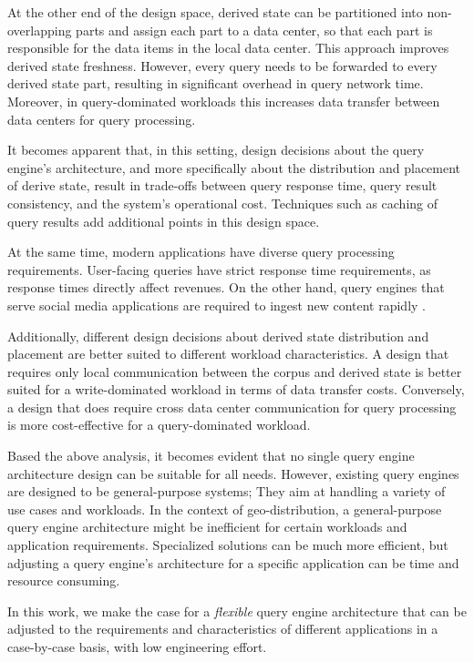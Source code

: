 At the other end of the design space,
derived state can be partitioned into non-overlapping parts and assign each part to a data center,
so that each part is responsible for the data items in the local data center.
This approach improves derived state freshness.
However, every query needs to be forwarded to every derived state part, resulting in significant overhead in query network time.
Moreover, in query-dominated workloads this increases data transfer between data centers for query processing.

\bigskip
\noindent
It becomes apparent that, in this setting, design decisions about the query engine's architecture,
and more specifically about the distribution and placement of derive state,
result in trade-offs between query response time, query result consistency, and the system's operational cost.
Techniques such as caching of query results add additional points in this design space.

At the same time,
modern applications have diverse query processing requirements.
User-facing queries have strict response time requirements, as response times directly affect revenues.
On the other hand, query engines that serve social media applications are required to ingest new content rapidly \cite{busch:earlybird}.

Additionally, different design decisions about derived state distribution and placement are better suited to different workload characteristics.
A design that requires only local communication between the corpus and derived state is better suited for a
write-dominated workload in terms of data transfer costs.
Conversely, a design that does require cross data center communication for query processing is more cost-effective
for a query-dominated workload.

\bigskip
\noindent
Based the above analysis, it becomes evident that no single query engine architecture design can be suitable for all
needs.
However, existing query engines are designed to be general-purpose systems;
They aim at handling a variety of use cases and workloads.
In the context of geo-distribution, a general-purpose query engine architecture might be inefficient for certain workloads
and application requirements.
Specialized solutions can be much more efficient, but adjusting a query engine's architecture for a specific application
can be time and resource consuming.

In this work, we make the case for a \textit{flexible} query engine architecture that can be adjusted to the requirements
and characteristics of different applications in a case-by-case basis, with low engineering effort.

